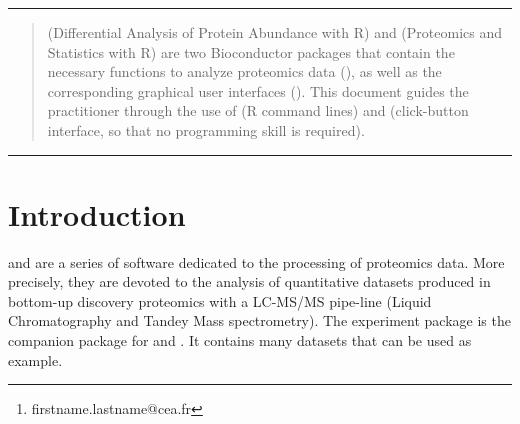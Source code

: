 \documentclass[12pt]{article}
\author{
Samuel Wieczorek\footnote{firstname.lastname@cea.fr} ,
Florence Combes$^\ast$,
Cosmin Lazar,
Quentin Giai Gianetto,\\
Laurent Gatto,
Alexia Dorffer,
Anne-Marie Hesse,
Yohann Coute,\\
Myriam Ferro,
Christophe Bruley
and Thomas Burger$^\ast$
}
\begin{document}


\maketitle



\hrule
\begin{abstract}
 (Differential Analysis of Protein Abundance with R) and 
 (Proteomics and Statistics with R) are two Bioconductor 
packages that contain the necessary functions to analyze proteomics data 
(), as well as the corresponding graphical user interfaces 
(). This document guides the practitioner through the use of
 (R command lines) and  (click-button 
interface, so that no programming skill is required).
\end{abstract}
\hrule
{}

\newpage
\tableofcontents
\newpage

\section{Introduction}\label{sec:intro}



 and  are a series of software dedicated to 
the processing of proteomics data. More precisely, they are devoted to the 
analysis of quantitative datasets produced in bottom-up discovery proteomics 
with a LC-MS/MS pipe-line (Liquid Chromatography and Tandey Mass 
spectrometry). The experiment package  is 
the companion package for  and . It contains 
many datasets that can be used as example.\newline
\end{document}

